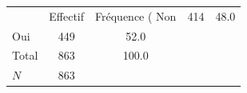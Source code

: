 {
\def\sym#1{\ifmmode^{#1}\else\(^{#1}\)\fi}
\begin{tabular}{l*{1}{cc}}
\toprule
            &    Effectif&Fréquence (%
\midrule
Non         &         414&        48.0\\
Oui         &         449&        52.0\\
Total       &         863&       100.0\\
\midrule
\(N\)       &         863&            \\
\bottomrule
\end{tabular}
}
